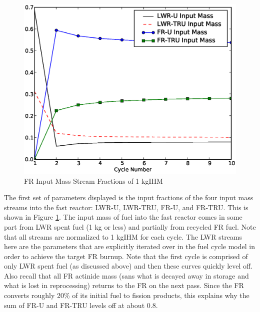 \begin{figure}[htbp]
\caption{FR Input Mass Stream Fractions of 1 kgIHM}
\label{1g_fig18}
\begin{center}
\includegraphics[scale=0.5]{one_group_method/figs/Fig18.eps}
\end{center}
\end{figure}

The first set of parameters displayed is the input fractions of the four input mass streams 
into the fast reactor: LWR-U, LWR-TRU, FR-U, and FR-TRU.  This is shown in Figure \ref{1g_fig18}.  
The input mass of fuel into the fast reactor comes in some part from LWR spent fuel (1 kg or less) 
and partially from recycled FR fuel.  Note that all streams are normalized to 1 kgIHM for each cycle.  
The LWR streams here are the parameters that are explicitly iterated over in the fuel cycle model 
in order to achieve the target FR burnup.  Note that the first cycle is comprised of only LWR 
spent fuel (as discussed above) and then these curves quickly level off.    Also recall that 
all FR actinide mass (sans what is decayed away in storage and what is lost in reprocessing) 
returns to the FR on the next pass.  Since the FR converts roughly 20\% of its initial fuel to 
fission products, this explains why the sum of FR-U and FR-TRU levels off at about 0.8.  

